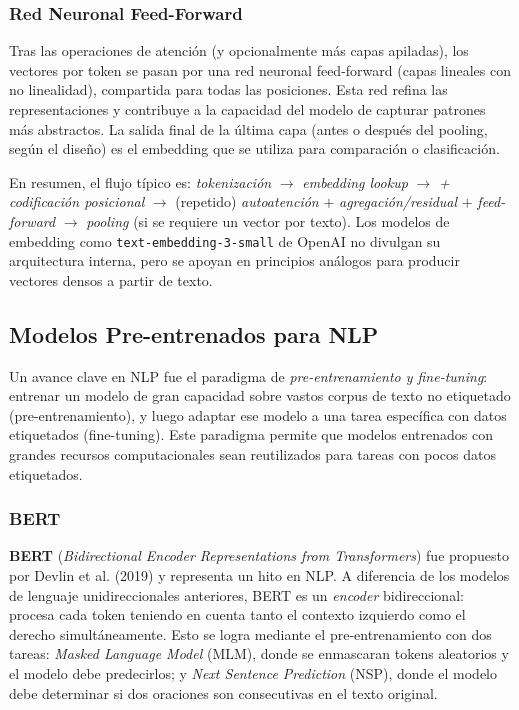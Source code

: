 \documentclass[11pt,a4paper]{article}
\begin{document}
\subsubsection{Red Neuronal Feed-Forward}

Tras las operaciones de atención (y opcionalmente más capas apiladas), los vectores por token se pasan por una red neuronal feed-forward (capas lineales con no linealidad), compartida para todas las posiciones. Esta red refina las representaciones y contribuye a la capacidad del modelo de capturar patrones más abstractos. La salida final de la última capa (antes o después del pooling, según el diseño) es el embedding que se utiliza para comparación o clasificación.

En resumen, el flujo típico es: \emph{tokenización} $\to$ \emph{embedding lookup} $\to$ \emph{+ codificación posicional} $\to$ (repetido) \emph{autoatención} $+$ \emph{agregación/residual} $+$ \emph{feed-forward} $\to$ \emph{pooling} (si se requiere un vector por texto). Los modelos de embedding como \texttt{text-embedding-3-small} de OpenAI no divulgan su arquitectura interna, pero se apoyan en principios análogos para producir vectores densos a partir de texto.

\subsection{Modelos Pre-entrenados para NLP}

Un avance clave en NLP fue el paradigma de \emph{pre-entrenamiento y fine-tuning}: entrenar un modelo de gran capacidad sobre vastos corpus de texto no etiquetado (pre-entrenamiento), y luego adaptar ese modelo a una tarea específica con datos etiquetados (fine-tuning). Este paradigma permite que modelos entrenados con grandes recursos computacionales sean reutilizados para tareas con pocos datos etiquetados.

\subsubsection{BERT}

\textbf{BERT} (\textit{Bidirectional Encoder Representations from Transformers}) fue propuesto por Devlin et al. (2019) \cite{devlin2019} y representa un hito en NLP. A diferencia de los modelos de lenguaje unidireccionales anteriores, BERT es un \emph{encoder} bidireccional: procesa cada token teniendo en cuenta tanto el contexto izquierdo como el derecho simultáneamente. Esto se logra mediante el pre-entrenamiento con dos tareas: \textit{Masked Language Model} (MLM), donde se enmascaran tokens aleatorios y el modelo debe predecirlos; y \textit{Next Sentence Prediction} (NSP), donde el modelo debe determinar si dos oraciones son consecutivas en el texto original.
\end{document}
